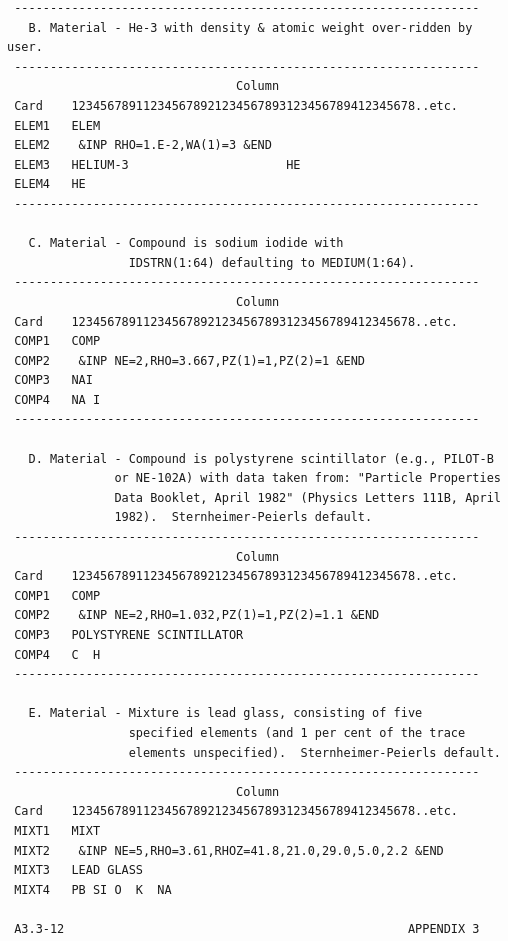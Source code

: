 \newpage  {} \begin{verbatim}
 -----------------------------------------------------------------
   B. Material - He-3 with density & atomic weight over-ridden by user.
 -----------------------------------------------------------------
                                Column
 Card    123456789112345678921234567893123456789412345678..etc.
 ELEM1   ELEM
 ELEM2    &INP RHO=1.E-2,WA(1)=3 &END
 ELEM3   HELIUM-3                      HE
 ELEM4   HE
 -----------------------------------------------------------------

   C. Material - Compound is sodium iodide with
                 IDSTRN(1:64) defaulting to MEDIUM(1:64).
 -----------------------------------------------------------------
                                Column
 Card    123456789112345678921234567893123456789412345678..etc.
 COMP1   COMP
 COMP2    &INP NE=2,RHO=3.667,PZ(1)=1,PZ(2)=1 &END
 COMP3   NAI
 COMP4   NA I
 -----------------------------------------------------------------

   D. Material - Compound is polystyrene scintillator (e.g., PILOT-B
               or NE-102A) with data taken from: "Particle Properties
               Data Booklet, April 1982" (Physics Letters 111B, April
               1982).  Sternheimer-Peierls default.
 -----------------------------------------------------------------
                                Column
 Card    123456789112345678921234567893123456789412345678..etc.
 COMP1   COMP
 COMP2    &INP NE=2,RHO=1.032,PZ(1)=1,PZ(2)=1.1 &END
 COMP3   POLYSTYRENE SCINTILLATOR
 COMP4   C  H
 -----------------------------------------------------------------

   E. Material - Mixture is lead glass, consisting of five
                 specified elements (and 1 per cent of the trace
                 elements unspecified).  Sternheimer-Peierls default.
 -----------------------------------------------------------------
                                Column
 Card    123456789112345678921234567893123456789412345678..etc.
 MIXT1   MIXT
 MIXT2    &INP NE=5,RHO=3.61,RHOZ=41.8,21.0,29.0,5.0,2.2 &END
 MIXT3   LEAD GLASS
 MIXT4   PB SI O  K  NA

 A3.3-12                                                APPENDIX 3
\end{verbatim}
